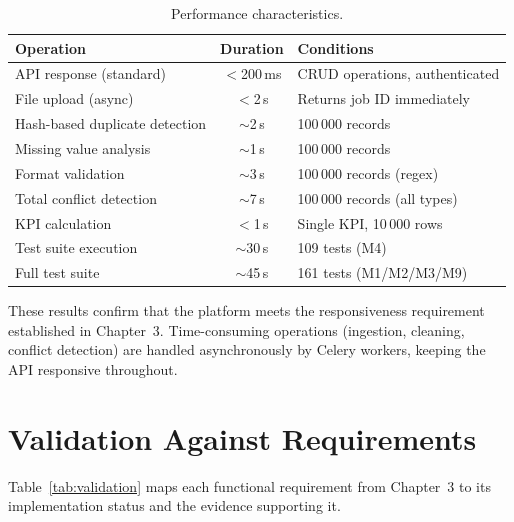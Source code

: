 \begin{table}[h!]
\centering
\caption{Performance characteristics.}
\label{tab:perf}
\renewcommand{\arraystretch}{1.3}
\begin{tabular}{|l|c|l|}
\hline
\textbf{Operation} & \textbf{Duration} & \textbf{Conditions} \\
\hline
API response (standard)         & $<$200\,ms   & CRUD operations, authenticated \\
File upload (async)             & $<$2\,s      & Returns job ID immediately \\
Hash-based duplicate detection  & $\sim$2\,s   & 100\,000 records \\
Missing value analysis          & $\sim$1\,s   & 100\,000 records \\
Format validation               & $\sim$3\,s   & 100\,000 records (regex) \\
Total conflict detection        & $\sim$7\,s   & 100\,000 records (all types) \\
KPI calculation                 & $<$1\,s      & Single KPI, 10\,000 rows \\
Test suite execution            & $\sim$30\,s  & 109 tests (M4) \\
Full test suite                 & $\sim$45\,s  & 161 tests (M1/M2/M3/M9) \\
\hline
\end{tabular}
\end{table}

\noindent
These results confirm that the platform
meets the responsiveness requirement
established in Chapter~3.
Time-consuming operations (ingestion, cleaning,
conflict detection) are handled asynchronously
by Celery workers,
keeping the API responsive throughout.


\section{Validation Against Requirements}

\noindent
Table~\ref{tab:validation} maps each functional requirement
from Chapter~3 to its implementation status
and the evidence supporting it.

